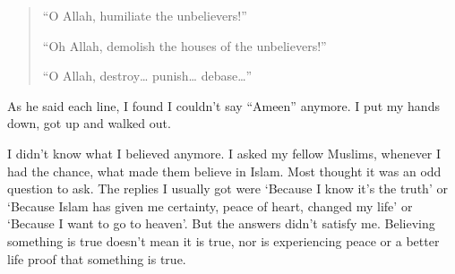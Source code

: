\documentclass[12pt]{memoir}
\begin{document}
\begin{quote}
“O Allah, humiliate the unbelievers!”

“Oh Allah, demolish the houses of the unbelievers!”

“O Allah, destroy… punish… debase…”
\end{quote}

As he said each line, I found I couldn’t say “Ameen” anymore.
I put my hands down, got up and walked out.

I didn’t know what I believed anymore.
I asked my fellow Muslims, whenever I had the chance,
what made them believe in Islam.
Most thought it was an odd question to ask.
The replies I usually got were ‘Because I know it’s the truth’
or ‘Because Islam has given me certainty, peace of heart,
changed my life’ or ‘Because I want to go to heaven’.
But the answers didn’t satisfy me.
Believing something is true doesn’t mean it is true,
nor is experiencing peace or a better life proof that something is true.
\end{document}
